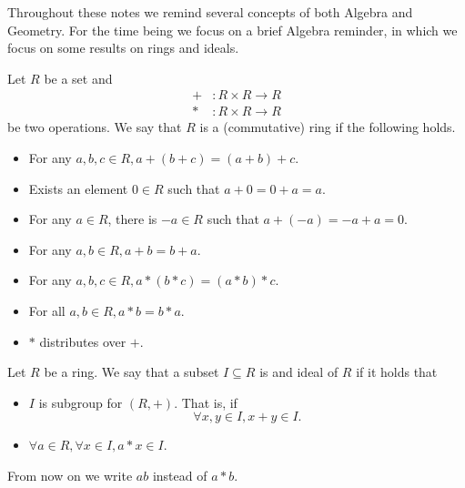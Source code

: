 \documentclass{subfiles}
\begin{document}
    Throughout these notes we remind several concepts of both Algebra and Geometry.
        For the time being we focus on a brief Algebra reminder,
        in which we focus on some results on rings and ideals.

    \begin{definition*}[Rings]
        Let \(R\) be a set and 
        \[\begin{aligned}
            + &: R \times R \to R \\ 
            * &: R \times R \to R
        \end{aligned}\]
        be two operations. We say that \(R\) is a (commutative) ring if the following holds.
        \begin{itemize}
            \item For any \(a, b, c \in R, a + (b + c) = (a + b) + c\).
            \item Exists an element \(0 \in R\) such that \(a + 0 = 0 + a = a\).
            \item For any \(a \in R\), there is \(-a \in R\) such that \(a + (-a) = -a + a = 0\).
            \item For any \(a, b \in R, a + b = b + a\).
            \item For any \(a, b, c \in R, a * (b * c) = (a * b) * c\).
            \item For all \(a, b \in R, a * b = b * a\).
            \item \(*\) distributes over \(+\).
        \end{itemize}
    \end{definition*}

    \begin{definition*}[Ideal]
        Let \(R\) be a ring. We say that a subset \(I \subseteq R\) is and ideal 
            of \(R\) if it holds that 
            \begin{itemize}
                \item \(I\) is subgroup for \((R, +)\). That is, if 
                    \[
                        \forall x, y \in I, x + y \in I.
                    \]
                \item \(\forall a \in R, \forall x \in I, a * x \in I\).
            \end{itemize}
    \end{definition*}

    \begin{remark*}
        From now on we write \(ab\) instead of \(a * b\).
    \end{remark*}
\end{document}
